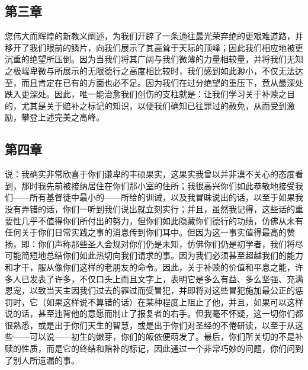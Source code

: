 
\subsection{第三章}

\par

您伟大而辉煌的新教义阐述，为我们开辟了一条通往最光荣弃绝的更艰难道路，并移开了我们眼前的鳞片，向我们展示了其高耸于天际的顶峰；因此我们相应地被更沉重的绝望所压倒。因为当我们将其广阔与我们微薄的力量相较量，并将我们无知之极端卑微与所展示的无限德行之高度相比较时，我们感到如此渺小，不仅无法达至，而且肯定在已有的方面也必不足。因为我们在过分绝望的重压下，竟从最深处跌入更深处。因此，唯一能治愈我们创伤的支柱就是：让我们学习关于补赎之目的，尤其是关于赔补之标记的知识，以便我们确知已往罪过的赦免，从而受到激励，攀登上述完美之高峰。\par


\subsection{第四章}

\par

说：我确实非常欣喜于你们谦卑的丰硕果实，这果实我曾以并非漠不关心的态度看到，那时我先前被接纳居住在你们那小室的住所；我很高兴你们如此恭敬地接受我们——所有基督徒中最小的——所给的训诫，以及我冒昧说出的话，以至于如果我没有弄错的话，你们一听到我们说出就立刻实行；并且，虽然我记得，这些话的重要性几乎不值得你们所付出的努力，但你们如此隐藏你们德行的功绩，仿佛从未有任何关于你们日常实践之事的消息传到你们耳中。但因为这一事实值得最高的赞扬，即：你们声称那些圣人会规对你们仍是未知，仿佛你们仍是初学者，我们将尽可能简短地总结你们如此热切向我们请求的事。因为我们必须甚至超越我们的能力和才干，服从像你们这样的老朋友的命令。因此，关于补赎的价值和平息之能，许多人已发表了许多，不仅口头上而且文字上，表明它是多么有益、多么坚强、充满恩宠，以致当天主因我们过去的罪过而受冒犯，并即将对这些冒犯施加最公正的惩罚时，它（如果这样说不算错的话）在某种程度上阻止了他，并且，如果可以这样说的话，甚至违背他的意愿而制止了报复者的右手。但我毫不怀疑，这一切你们都很熟悉，或是出于你们天生的智慧，或是出于你们对圣经的不倦研读，以至于从这些——可以说——初生的嫩芽，你们的皈依便萌发了。最后，你们所关切的不是补赎的性质，而是它的终结和赔补的标记，因此通过一个非常巧妙的问题，你们问到了别人所遗漏的事。\par

